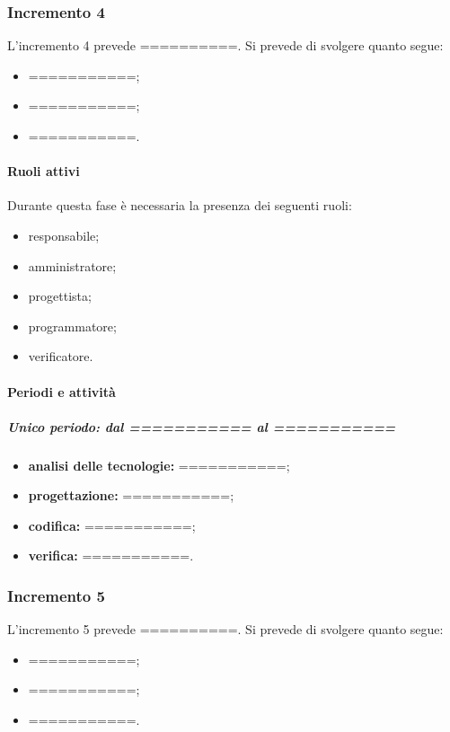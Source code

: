 \subsubsection{Incremento 4}
L'incremento 4 prevede ==========. Si prevede di svolgere quanto segue:
\begin{itemize}
	\item ===========;
	\item ===========;
	\item ===========.
\end{itemize}

\paragraph{Ruoli attivi}
Durante questa fase è necessaria la presenza dei seguenti ruoli: 
\begin{itemize} 
	\item responsabile; 
	\item amministratore; 
	\item progettista; 
	\item programmatore; 
	\item verificatore.
\end{itemize}

\paragraph{Periodi e attività}
\subparagraph{Unico periodo: dal =========== al ===========}
\begin{itemize}
	\item \textbf{analisi delle tecnologie:} ===========;
	\item \textbf{progettazione:} ===========;
	\item \textbf{codifica:} ===========;
	\item \textbf{verifica:} ===========.
\end{itemize}


\subsubsection{Incremento 5}
L'incremento 5 prevede ==========. Si prevede di svolgere quanto segue:
\begin{itemize}
	\item ===========;
	\item ===========;
	\item ===========.
\end{itemize}

